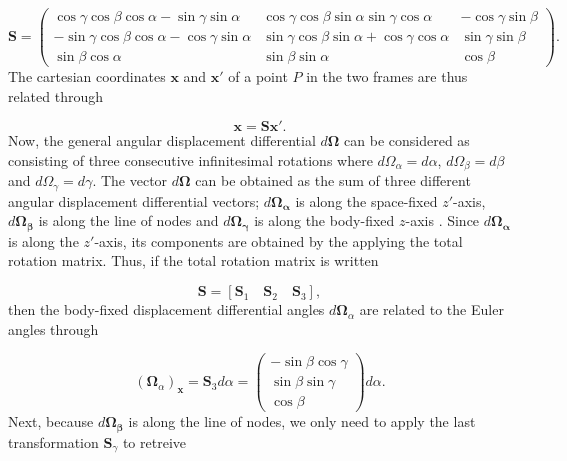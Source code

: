 \begin{equation}
\mathbf{S}=
\begin{pmatrix}
\cos\gamma \cos\beta \cos\alpha -\sin\gamma \sin\alpha & \cos\gamma \cos\beta \sin\alpha \sin\gamma \cos\alpha  & -\cos\gamma \sin\beta\\
-\sin\gamma \cos\beta \cos\alpha -\cos\gamma \sin\alpha & \sin\gamma \cos\beta \sin\alpha +\cos\gamma \cos\alpha & \sin\gamma \sin\beta\\
\sin\beta \cos\alpha & \sin\beta \sin\alpha & \cos\beta
\end{pmatrix}.
\end{equation}
The cartesian coordinates $\mathbf{x}$ and $\mathbf{x}'$ of a point $P$ in the two frames are thus related through

\begin{equation}
\mathbf{x} = \mathbf{S}\mathbf{x}'. 
\end{equation}
Now, the general angular displacement differential  $d\mathbf{\Omega}$ can be considered as consisting of three consecutive infinitesimal rotations where $d\Omega_{\alpha} = d\alpha$, $d\Omega_{\beta} = d\beta$ and $d\Omega_{\gamma} = d\gamma$. The vector $d\mathbf{\Omega}$ can be obtained as the sum of three different angular displacement differential vectors; $d\mathbf{\Omega_{\alpha}}$ is along the space-fixed $z'$-axis, $d\mathbf{\Omega_{\beta}}$ is along the line of nodes and $d\mathbf{\Omega_{\gamma}}$ is along the body-fixed $z$-axis \cite{goldstein_poole_safko_2000}. Since $d\mathbf{\Omega_{\alpha}}$ is along the $z'$-axis, its components are obtained by the applying the total rotation matrix. Thus, if the total rotation matrix is written

\begin{equation}
\mathbf{S} = [\mathbf{S}_1 \quad \mathbf{S}_2 \quad \mathbf{S}_3],
\end{equation}
then the body-fixed displacement differential angles $d\mathbf{\Omega}_{\alpha}$ are related to the Euler angles through

\begin{equation}
(\mathbf{\Omega}_{\alpha})_{\mathbf{x}} = \mathbf{S}_3 d\alpha= 
\begin{pmatrix}
-\sin\beta \cos\gamma \\
\sin\beta \sin\gamma \\
\cos\beta
\end{pmatrix} d\alpha.
\end{equation}
Next, because $d\mathbf{\Omega_{\beta}}$ is along the line of nodes, we only need to apply the last transformation $\mathbf{S}_{\gamma}$ to retreive

